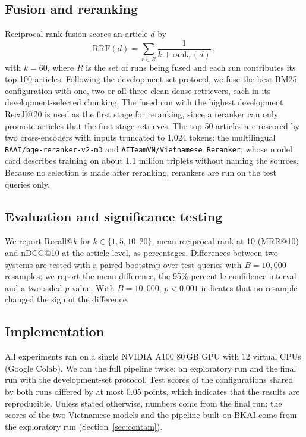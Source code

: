 \documentclass{ws-vjcs}
\begin{document}
\subsection{Fusion and reranking}

Reciprocal rank fusion\cite{cormack2009rrf} scores an article $d$ by
\begin{equation}
\mathrm{RRF}(d) = \sum_{r \in R} \frac{1}{k + \mathrm{rank}_r(d)}\,,
\label{eq:rrf}
\end{equation}
with $k = 60$, where $R$ is the set of runs being fused and each run contributes its top 100 articles. Following the development-set protocol, we fuse the best BM25 configuration with one, two or all three clean dense retrievers, each in its development-selected chunking. The fused run with the highest development Recall@20 is used as the first stage for reranking, since a reranker can only promote articles that the first stage retrieves. The top 50 articles are rescored by two cross-encoders with inputs truncated to 1,024 tokens: the multilingual \texttt{BAAI/bge-reranker-v2-m3}\cite{chen2024bgem3} and \texttt{AITeamVN/Vietnamese\_Reranker}, whose model card describes training on about 1.1 million triplets without naming the sources.\cite{aiteam2025embedding} Because no selection is made after reranking, rerankers are run on the test queries only.

\subsection{Evaluation and significance testing}

We report Recall@$k$ for $k \in \{1, 5, 10, 20\}$, mean reciprocal rank at 10 (MRR@10) and nDCG@10\cite{jarvelin2002ndcg} at the article level, as percentages. Differences between two systems are tested with a paired bootstrap over test queries\cite{efron1993bootstrap,sakai2006bootstrap,smucker2007significance} with $B = 10{,}000$ resamples; we report the mean difference, the 95\% percentile confidence interval and a two-sided $p$-value. With $B = 10{,}000$, $p < 0.001$ indicates that no resample changed the sign of the difference.

\subsection{Implementation}

All experiments ran on a single NVIDIA A100 80\,GB GPU with 12 virtual CPUs (Google Colab). We ran the full pipeline twice: an exploratory run and the final run with the development-set protocol. Test scores of the configurations shared by both runs differed by at most 0.05 points, which indicates that the results are reproducible. Unless stated otherwise, numbers come from the final run; the scores of the two Vietnamese models and the pipeline built on BKAI come from the exploratory run (Section~\ref{sec:contam}).
\end{document}

